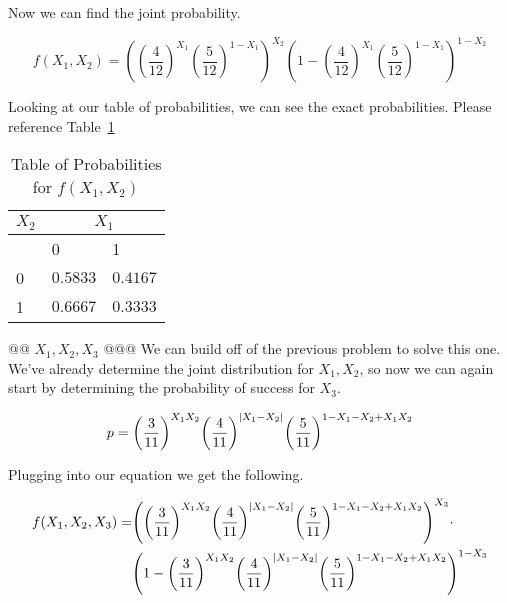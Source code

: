 \documentclass[11pt]{article}\usepackage[]{graphicx}\usepackage[]{xcolor}
\begin{document}
\begin{easylist}[enumerate]
    Now we can find the joint probability.

    \[
        f(X_1, X_2) = { \left( { \left( \frac{4}{12} \right) }^{X_1} { \left( \frac{5}{12} \right) }^{1 - X_1} \right) }^{X_2}
        { \left( 1 - { \left( \frac{4}{12} \right) }^{X_1} { \left( \frac{5}{12} \right) }^{1 - X_1} \right) }^{1 - X_2}
    \]




    Looking at our table of probabilities, we can see the exact probabilities. Please reference
    Table~\ref{table:probs.a}

    \begin{table}
        \centering
        \begin{tabular}{|l|l|l|}
            \hline
            $X_2$ & \multicolumn{2}{|c|}{$X_1$}\\
            \hline
            & 0 & 1\\
            \hline
            0 & $0.5833$ & $0.4167$\\
            1 & $0.6667$ & $0.3333$\\
            \hline
        \end{tabular}
        \caption{Table of Probabilities for $f(X_1, X_2)$}
        \label{table:probs.a}
    \end{table}

    @@ $X_1, X_2, X_3$
    @@@ We can build off of the previous problem to solve this one. We've already determine the joint distribution for
    $X_1, X_2$, so now we can again start by determining the probability of success for $X_3$.

    \[
        p = { \left( \frac{3}{11} \right) }^{X_1 X_2}
            { \left( \frac{4}{11} \right) }^{\left\lvert X_1 - X_2 \right\rvert}
            { \left( \frac{5}{11} \right) }^{1 - X_1 - X_2 + X_1 X_2}
    \]

    Plugging into our equation we get the following.

    \[
        \begin{aligned}
            f(X_1, X_2, X_3) =& { \left( { \left( \frac{3}{11} \right) }^{X_1 X_2}
                                        { \left( \frac{4}{11} \right) }^{\left\lvert X_1 - X_2 \right\rvert}
                                        { \left( \frac{5}{11} \right) }^{1 - X_1 - X_2 + X_1 X_2}
                                 \right) }^{X_3} \cdot \\
                              & { \left( 1 - { \left( \frac{3}{11} \right) }^{X_1 X_2}
                                        { \left( \frac{4}{11} \right) }^{\left\lvert X_1 - X_2 \right\rvert}
                                        { \left( \frac{5}{11} \right) }^{1 - X_1 - X_2 + X_1 X_2}
                                 \right) }^{1 - X_3}
         \end{aligned}
    \]





\end{easylist}
\end{document}
